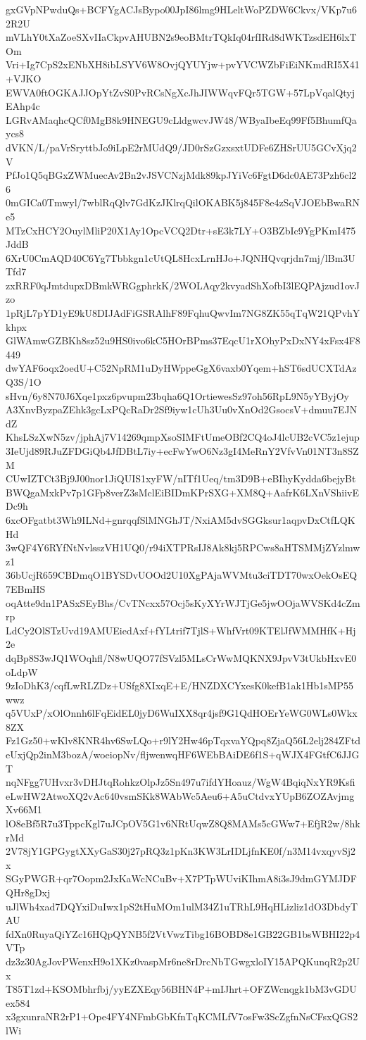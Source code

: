 gxGVpNPwduQs+BCFYgACJsBypo00JpI86lmg9HLeltWoPZDW6Ckvx/VKp7u62R2U
mVLhY0tXaZoeSXvIIaCkpvAHUBN2s9eoBMtrTQkIq04rfIRd8dWKTzsdEH6lxTOm
Vri+Ig7CpS2xENbXH8ibLSYV6W8OvjQYUYjw+pvYVCWZbFiEiNKmdRI5X41+VJKO
EWVA0ftOGKAJJOpYtZvS0PvRCsNgXcJhJIWWqvFQr5TGW+57LpVqalQtyjEAhp4c
LGRvAMaqhcQCf0MgB8k9HNEGU9cLldgwcvJW48/WByaIbeEq99Ff5BhumfQaycs8
dVKN/L/paVrSryttbJo9iLpE2rMUdQ9/JD0rSzGzxsxtUDFe6ZHSrUU5GCvXjq2V
PfJo1Q5qBGxZWMuecAv2Bn2vJSVCNzjMdk89kpJYiVc6FgtD6dc0AE73Pzh6cl26
0mGICa0Tmwyl/7wblRqQlv7GdKzJKlrqQilOKABK5j845F8e4zSqVJOEbBwaRNe5
MTzCxHCY2OuylMliP20X1Ay1OpcVCQ2Dtr+sE3k7LY+O3BZbIc9YgPKmI475JddB
6XrU0CmAQD40C6Yg7Tbbkgn1cUtQL8HcxLrnHJo+JQNHQvqrjdn7mj/lBm3UTfd7
zxRRF0qJmtdupxDBmkWRGgphrkK/2WOLAqy2kvyadShXofbI3lEQPAjzud1ovJzo
1pRjL7pYD1yE9kU8DIJAdFiGSRAlhF89FqhuQwvIm7NG8ZK55qTqW21QPvhYkhpx
GlWAmwGZBKh8sz52u9HS0ivo6kC5HOrBPms37EqcU1rXOhyPxDxNY4xFsx4F8449
dwYAF6oqx2oedU+C52NpRM1uDyHWppeGgX6vaxb0Yqem+hST6sdUCXTdAzQ3S/1O
sHvn/6y8N70J6Xqe1pxz6pvupm23bqha6Q1OrtiewesSz97oh56RpL9N5yYByjOy
A3XnvByzpaZEhk3gcLxPQcRaDr2Sf9iyw1cUh3Uu0vXnOd2GsocsV+dmuu7EJNdZ
KhsLSzXwN5zv/jphAj7V14269qmpXsoSIMFtUmeOBf2CQ4oJ4lcUB2cVC5z1ejup
3IeUjd89RJuZFDGiQb4JfDBtL7iy+ecFwYwO6Nz3gI4MeRnY2VfvVn01NT3n8SZM
CUwIZTCt3Bj9J00nor1JiQUIS1xyFW/nITf1Ueq/tm3D9B+eBIhyKydda6bejyBt
BWQgaMxkPv7p1GFp8verZ3sMclEiBIDmKPrSXG+XM8Q+AafrK6LXnVShiivEDc9h
6xcOFgatbt3Wh9ILNd+gnrqqfSlMNGhJT/NxiAM5dvSGGksur1aqpvDxCtfLQKHd
3wQF4Y6RYfNtNvlsszVH1UQ0/r94iXTPRsIJ8Ak8kj5RPCws8aHTSMMjZYzlmwz1
36bUcjR659CBDmqO1BYSDvUOOd2U10XgPAjaWVMtu3ciTDT70wxOekOsEQ7EBmHS
oqAtte9dn1PASxSEyBhs/CvTNcxx57Ocj5sKyXYrWJTjGe5jwOOjaWVSKd4cZmrp
LdCy2OlSTzUvd19AMUEiedAxf+fYLtrif7TjlS+WhfVrt09KTElJfWMMHfK+Hj2e
dqBp8S3wJQ1WOqhfl/N8wUQO77fSVzl5MLsCrWwMQKNX9JpvV3tUkbHxvE0oLdpW
9zIoDhK3/cqfLwRLZDz+USfg8XIxqE+E/HNZDXCYxesK0kefB1ak1Hb1sMP55wwz
q5VUxP/xOlOnnh6lFqEidEL0jyD6WuIXX8qr4jsf9G1QdHOErYeWG0WLs0Wkx8ZX
Fz1Gz50+wKlv8KNR4hv6SwLQo+r9lY2Hw46pTqxvaYQpq8ZjaQ56L2elj284ZFtd
eUxjQp2inM3bozA/woeiopNv/fljwenwqHF6WEbBAiDE6f1S+qWJX4FGtfC6JJGT
nqNFgg7UHvxr3vDHJtqRohkzOlpJz5Sn497u7ifdYHoauz/WgW4BqiqNxYR9Ksfi
eLwHW2AtwoXQ2vAc640vsmSKk8WAbWc5Aeu6+A5uCtdvxYUpB6ZOZAvjmgXv66M1
lO8eBf5R7u3TppcKgl7uJCpOV5G1v6NRtUqwZ8Q8MAMs5cGWw7+EfjR2w/8hkrMd
2V78jY1GPGygtXXyGaS30j27pRQ3z1pKn3KW3LrIDLjfnKE0f/n3M14vxqyvSj2x
SGyPWGR+qr7Oopm2JxKaWcNCuBv+X7PTpWUviKIhmA8i3sJ9dmGYMJDFQHr8gDxj
uJlWh4xad7DQYxiDuIwx1pS2tHuMOm1ulM34Z1uTRhL9HqHLizliz1dO3DbdyTAU
fdXn0RuyaQiYZc16HQpQYNB5f2VtVwzTibg16BOBD8e1GB22GB1bsWBHI22p4VTp
dz3z30AgJovPWenxH9o1XKz0vaspMr6ne8rDrcNbTGwgxloIY15APQKunqR2p2Ux
T85T1zd+KSOMbhrfbj/yyEZXEqy56BHN4P+mIJhrt+OFZWcnqgk1bM3vGDUex584
x3gxunraNR2rP1+Ope4FY4NFmbGbKfnTqKCMLfV7osFw3ScZgfnNsCFsxQGS2lWi
